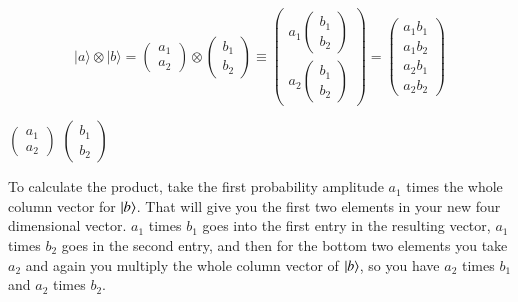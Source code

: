 \begin{equation}
|a\rangle \otimes|b\rangle=\left(\begin{array}{l}
a_{1} \\
a_{2}
\end{array}\right) \otimes\left(\begin{array}{l}
b_{1} \\
b_{2}
\end{array}\right) \equiv\left(\begin{array}{l}
a_{1}\left(\begin{array}{l}
b_{1} \\
b_{2}
\end{array}\right) \\
a_{2}\left(\begin{array}{l}
b_{1} \\
b_{2}
\end{array}\right)
\end{array}\right)=\left(\begin{array}{l}
a_{1} b_{1} \\
a_{1} b_{2} \\
a_{2} b_{1} \\
a_{2} b_{2}
\end{array}\right)
\end{equation}

$
\left(\begin{array}{l}
a_1 \\
a_2
\end{array}\right)$
$\left(\begin{array}{l}
b_1 \\
b_2
\end{array}\right)$
\fi

To calculate the product, take the first probability amplitude $a_1$ times the whole column vector for $\left| b \right\rangle$. That will give you the first two elements in your new four dimensional vector.  $a_1$ times $b_1$ goes into the first entry in the resulting vector, $a_1$ times $b_2$ goes in the second entry, and then for the bottom two elements you take $a_2$ and again you multiply the whole column vector of $\left| b \right\rangle$, so you have $a_2$ times $b_1$ and $a_2$ times $b_2$.

